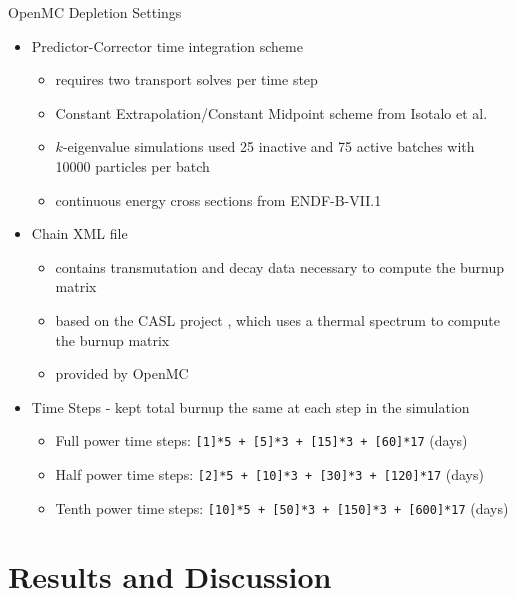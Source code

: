\documentclass[9pt,t,aspectratio=169]{beamer}
\begin{document}
\begin{frame}{OpenMC Depletion Settings}
    \begin{itemize}
        \item Predictor-Corrector time integration scheme
        \begin{itemize}
            \item requires two transport solves per time step
            \item Constant Extrapolation/Constant Midpoint scheme from Isotalo et al. \cite{isotalo_comparison_2015}
            \item $k$-eigenvalue simulations used 25 inactive and 75 active batches with 10000 particles per batch
            \item continuous energy cross sections from ENDF-B-VII.1
        \end{itemize}
        \item Chain XML file
        \begin{itemize}
            \item contains transmutation and decay data necessary to compute the burnup matrix
            \item based on the CASL project \cite{CASL-report}, which uses a thermal spectrum to compute the burnup matrix
            \item provided by OpenMC \cite{openmc-chains}
        \end{itemize}
        \item Time Steps - kept total burnup the same at each step in the simulation
        \begin{itemize}
            \item Full power time steps: \texttt{[1]*5 + [5]*3 + [15]*3 + [60]*17} (days)
            \item Half power time steps: \texttt{[2]*5 + [10]*3 + [30]*3 + [120]*17} (days)
            \item Tenth power time steps: \texttt{[10]*5 + [50]*3 + [150]*3 + [600]*17} (days)
        \end{itemize}
    \end{itemize}
\end{frame}
\section{Results and Discussion}
\end{document}
